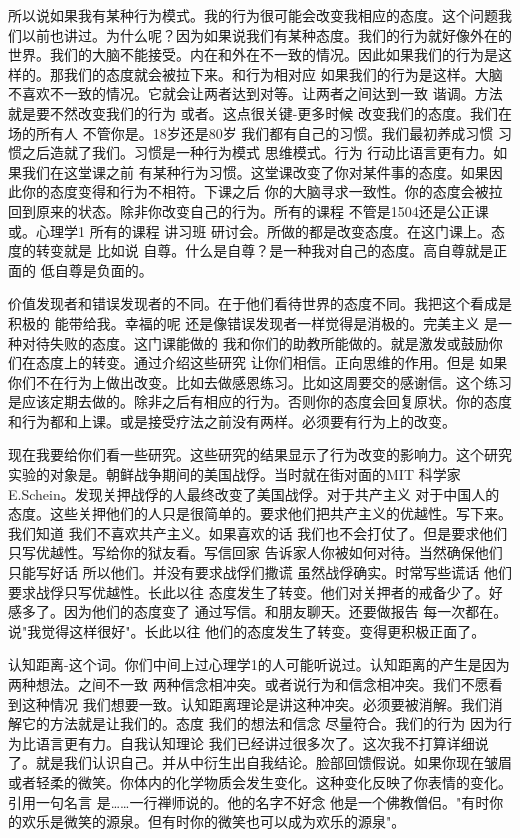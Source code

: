 所以说如果我有某种行为模式。我的行为很可能会改变我相应的态度。这个问题我们以前也讲过。为什么呢？因为如果说我们有某种态度。我们的行为就好像外在的世界。我们的大脑不能接受。内在和外在不一致的情况。因此如果我们的行为是这样的。那我们的态度就会被拉下来。和行为相对应 如果我们的行为是这样。大脑不喜欢不一致的情况。它就会让两者达到对等。让两者之间达到一致 谐调。方法就是要不然改变我们的行为 或者。这点很关键-更多时候 改变我们的态度。我们在场的所有人 不管你是。18岁还是80岁 我们都有自己的习惯。我们最初养成习惯 习惯之后造就了我们。习惯是一种行为模式 思维模式。行为 行动比语言更有力。如果我们在这堂课之前 有某种行为习惯。这堂课改变了你对某件事的态度。如果因此你的态度变得和行为不相符。下课之后 你的大脑寻求一致性。你的态度会被拉回到原来的状态。除非你改变自己的行为。所有的课程 不管是1504还是公正课或。心理学1 所有的课程 讲习班 研讨会。所做的都是改变态度。在这门课上。态度的转变就是 比如说 自尊。什么是自尊？是一种我对自己的态度。高自尊就是正面的 低自尊是负面的。 

价值发现者和错误发现者的不同。在于他们看待世界的态度不同。我把这个看成是积极的 能带给我。幸福的呢 还是像错误发现者一样觉得是消极的。完美主义 是一种对待失败的态度。这门课能做的 我和你们的助教所能做的。就是激发或鼓励你们在态度上的转变。通过介绍这些研究 让你们相信。正向思维的作用。但是 如果你们不在行为上做出改变。比如去做感恩练习。比如这周要交的感谢信。这个练习是应该定期去做的。除非之后有相应的行为。否则你的态度会回复原状。你的态度和行为都和上课。或是接受疗法之前没有两样。必须要有行为上的改变。 

现在我要给你们看一些研究。这些研究的结果显示了行为改变的影响力。这个研究实验的对象是。朝鲜战争期间的美国战俘。当时就在街对面的MIT 科学家E.Schein。发现关押战俘的人最终改变了美国战俘。对于共产主义 对于中国人的态度。这些关押他们的人只是很简单的。要求他们把共产主义的优越性。写下来。我们知道 我们不喜欢共产主义。如果喜欢的话 我们也不会打仗了。但是要求他们只写优越性。写给你的狱友看。写信回家 告诉家人你被如何对待。当然确保他们只能写好话 所以他们。并没有要求战俘们撒谎 虽然战俘确实。时常写些谎话 他们要求战俘只写优越性。长此以往 态度发生了转变。他们对关押者的戒备少了。好感多了。因为他们的态度变了 通过写信。和朋友聊天。还要做报告 每一次都在。说"我觉得这样很好"。长此以往 他们的态度发生了转变。变得更积极正面了。 

认知距离-这个词。你们中间上过心理学1的人可能听说过。认知距离的产生是因为两种想法。之间不一致 两种信念相冲突。或者说行为和信念相冲突。我们不愿看到这种情况 我们想要一致。认知距离理论是讲这种冲突。必须要被消解。我们消解它的方法就是让我们的。态度 我们的想法和信念 尽量符合。我们的行为 因为行为比语言更有力。自我认知理论 我们已经讲过很多次了。这次我不打算详细说了。就是我们认识自己。并从中衍生出自我结论。脸部回馈假说。如果你现在皱眉或者轻柔的微笑。你体内的化学物质会发生变化。这种变化反映了你表情的变化。引用一句名言 是……一行禅师说的。他的名字不好念 他是一个佛教僧侣。"有时你的欢乐是微笑的源泉。但有时你的微笑也可以成为欢乐的源泉"。 

